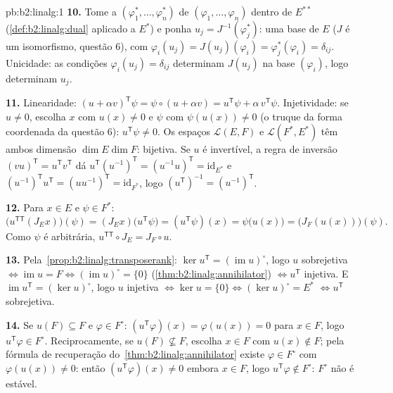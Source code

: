 \begin{solution}{pb:b2:linalg:1}
\textbf{10.} Tome a  $(\varphi_1^*, \dots,
\varphi_n^*)$ de $(\varphi_1, \dots, \varphi_n)$ dentro de $E^{**}$
(\cref{def:b2:linalg:dual} aplicado a $E^*$) e ponha $u_j =
J^{-1}(\varphi_j^*)$: uma base de $E$ ($J$ é um isomorfismo,
questão 6), com $\varphi_i(u_j) = J(u_j)(\varphi_i) =
\varphi_j^*(\varphi_i) = \delta_{ij}$. Unicidade: as condições
$\varphi_i(u_j) = \delta_{ij}$ determinam $J(u_j)$ na base
$(\varphi_i)$, logo determinam $u_j$.

\textbf{11.} Linearidade: $(u + \alpha v)^{\mathsf T}\psi = \psi
\circ (u + \alpha v) = u^{\mathsf T}\psi + \alpha\, v^{\mathsf
T}\psi$. Injetividade: se $u \neq 0$, escolha $x$ com $u(x) \neq 0$
e $\psi$ com $\psi(u(x)) \neq 0$ (o truque da forma coordenada da
questão 6): $u^{\mathsf T}\psi \neq 0$. Os espaços $\mathcal{L}(E,F)$
e $\mathcal{L}(F^*, E^*)$ têm ambos dimensão $\dim E \dim F$:
bijetiva. Se $u$ é invertível, a regra de inversão $(vu)^{\mathsf
T} = u^{\mathsf T}v^{\mathsf T}$ dá $u^{\mathsf
T}(u^{-1})^{\mathsf T} = (u^{-1}u)^{\mathsf T} =
\mathrm{id}_{E^*}$ e $(u^{-1})^{\mathsf T}u^{\mathsf T} =
(uu^{-1})^{\mathsf T} = \mathrm{id}_{F^*}$, logo $(u^{\mathsf
T})^{-1} = (u^{-1})^{\mathsf T}$.

\textbf{12.} Para $x \in E$ e $\psi \in F^*$:
\[
\bigl(u^{\mathsf T\mathsf T}(J_E x)\bigr)(\psi)
= (J_E x)\bigl(u^{\mathsf T}\psi\bigr)
= (u^{\mathsf T}\psi)(x)
= \psi\bigl(u(x)\bigr)
= \bigl(J_F(u(x))\bigr)(\psi).
\]
Como $\psi$ é arbitrária, $u^{\mathsf T\mathsf T} \circ J_E = J_F
\circ u$.

\textbf{13.} Pela~\cref{prop:b2:linalg:transposerank}: $\ker
u^{\mathsf T} = (\operatorname{im} u)^\circ$, logo $u$ sobrejetiva
$\iff \operatorname{im} u = F \iff (\operatorname{im}u)^\circ =
\{0\}$ (\cref{thm:b2:linalg:annihilator}) $\iff u^{\mathsf T}$
injetiva. E $\operatorname{im} u^{\mathsf T} = (\ker
u)^\circ$, logo $u$ injetiva $\iff \ker u = \{0\} \iff (\ker
u)^\circ = E^*$ $\iff u^{\mathsf T}$ sobrejetiva.

\textbf{14.} Se $u(F) \subseteq F$ e $\varphi \in F^\circ$:
$(u^{\mathsf T}\varphi)(x) = \varphi(u(x)) = 0$ para $x \in F$, logo
$u^{\mathsf T}\varphi \in F^\circ$. Reciprocamente, se $u(F)
\not\subseteq F$, escolha $x \in F$ com $u(x) \notin F$; pela
fórmula de recuperação do~\cref{thm:b2:linalg:annihilator} existe
$\varphi \in F^\circ$ com $\varphi(u(x)) \neq 0$: então
$(u^{\mathsf T}\varphi)(x) \neq 0$ embora $x \in F$, logo
$u^{\mathsf T}\varphi \notin F^\circ$: $F^\circ$ não é estável.


\end{solution}
